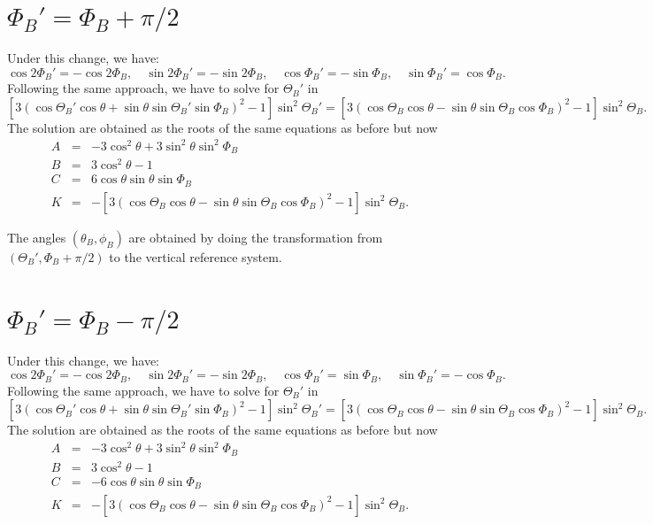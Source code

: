 \documentclass[12pt]{article}
\begin{document}
\section{\texorpdfstring{$\Phi_B' = \Phi_B+\pi/2$}{PhiB'=PhiB+pi/2}}
Under this change, we have:
\begin{equation}
\cos 2\Phi_B' = -\cos 2\Phi_B, \quad \sin 2\Phi_B' = -\sin 2\Phi_B, \quad \cos \Phi_B' = -\sin \Phi_B, \quad \sin \Phi_B' = \cos \Phi_B.
\end{equation}
Following the same approach, we have to solve for $\Theta_B'$ in 
\begin{equation}
\left[ 3 \left( \cos \Theta_B' \cos \theta + \sin\theta \sin\Theta_B' \sin\Phi_B\right)^2-1 \right] \sin^2 \Theta_B' = 
\left[ 3 \left( \cos \Theta_B \cos \theta - \sin\theta \sin\Theta_B \cos\Phi_B\right)^2-1 \right] \sin^2 \Theta_B.
\end{equation}
The solution are obtained as the roots of the same equations as before but now
\begin{eqnarray}
A &=& -3\cos^2 \theta + 3\sin^2 \theta \sin^2 \Phi_B \nonumber \\
B &=& 3\cos^2 \theta - 1 \nonumber \\
C &=& 6 \cos\theta \sin\theta \sin \Phi_B \nonumber \\
K &=& -\left[ 3 \left( \cos \Theta_B \cos \theta - \sin\theta \sin\Theta_B \cos\Phi_B\right)^2-1 \right] \sin^2 \Theta_B.
\end{eqnarray}

The angles $(\theta_B,\phi_B)$ are obtained by doing the transformation from $(\Theta_B',\Phi_B+\pi/2)$ to the
vertical reference system.


\section{\texorpdfstring{$\Phi_B' = \Phi_B-\pi/2$}{PhiB'=PhiB-pi/2}}
Under this change, we have:
\begin{equation}
\cos 2\Phi_B' = -\cos 2\Phi_B, \quad \sin 2\Phi_B' = -\sin 2\Phi_B, \quad \cos \Phi_B' = \sin \Phi_B, \quad \sin \Phi_B' = -\cos \Phi_B.
\end{equation}
Following the same approach, we have to solve for $\Theta_B'$ in 
\begin{equation}
\left[ 3 \left( \cos \Theta_B' \cos \theta + \sin\theta \sin\Theta_B' \sin\Phi_B\right)^2-1 \right] \sin^2 \Theta_B' = 
\left[ 3 \left( \cos \Theta_B \cos \theta - \sin\theta \sin\Theta_B \cos\Phi_B\right)^2-1 \right] \sin^2 \Theta_B.
\end{equation}
The solution are obtained as the roots of the same equations as before but now
\begin{eqnarray}
A &=& -3\cos^2 \theta + 3\sin^2 \theta \sin^2 \Phi_B \nonumber \\
B &=& 3\cos^2 \theta - 1 \nonumber \\
C &=& -6 \cos\theta \sin\theta \sin \Phi_B \nonumber \\
K &=& -\left[ 3 \left( \cos \Theta_B \cos \theta - \sin\theta \sin\Theta_B \cos\Phi_B\right)^2-1 \right] \sin^2 \Theta_B.
\end{eqnarray}
\end{document}
